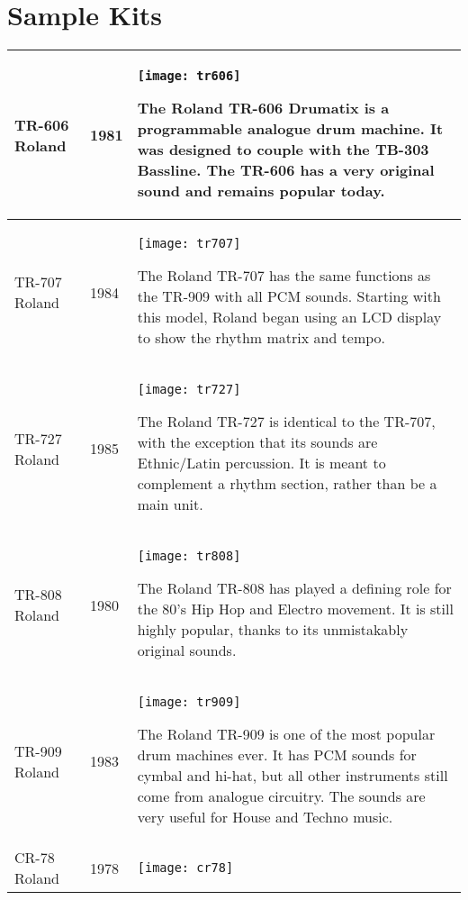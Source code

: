 \chapter{Sample Kits}

\tablelasttail{ \hline }
\begin{xtabular}{p{2.02cm}|l|p{7.8cm}}

\hline
TR-606 \linebreak Roland & 1981 & 
\texttt{[image: tr606]}

The Roland TR-606 Drumatix is a programmable analogue drum machine. It was designed to couple with the TB-303 Bassline. The TR-606 has a very original sound and remains popular today. \\
\hline
TR-707 \linebreak Roland & 1984 & 
\texttt{[image: tr707]}

The Roland TR-707 has the same functions as the TR-909 with all PCM sounds. Starting with this model, Roland began using an LCD display to show the rhythm matrix and tempo. \\
\hline
TR-727 \linebreak Roland & 1985 & 
\texttt{[image: tr727]}

The Roland TR-727 is identical to the TR-707, with the exception that its sounds are Ethnic/Latin percussion. It is meant to complement a rhythm section, rather than be a main unit. \\
\hline
TR-808 \linebreak Roland & 1980 & 
\texttt{[image: tr808]}

The Roland TR-808 has played a defining role for the 80's Hip Hop and Electro movement. It is still highly popular, thanks to its unmistakably original sounds. \\
\hline
TR-909 \linebreak Roland & 1983 & 
\texttt{[image: tr909]}

The Roland TR-909 is one of the most popular drum machines ever. It has PCM sounds for cymbal and hi-hat, but all other instruments still come from analogue circuitry. The sounds are very useful for House and Techno music. \\
\hline
CR-78 \linebreak Roland & 1978 & 
\texttt{[image: cr78]}


\end{xtabular}
